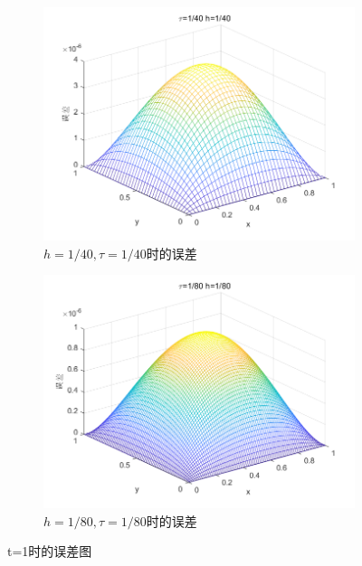 \documentclass[withoutpreface,bwprint]{cumcmthesis} %
\begin{document}
\begin{figure}
	\begin{subfigure}[b]{0.475\textwidth}   
		\centering 
		\includegraphics[width=\textwidth]{figures/f4}
		\caption[]%
		{{\small $h=1/40,\tau=1/40$时的误差}}    
		\label{fig:mean and std of net34}
	\end{subfigure}
	\quad
	\begin{subfigure}[b]{0.475\textwidth}   
		\centering 
		\includegraphics[width=\textwidth]{figures/f5}
		\caption[]%
		{{\small $h=1/80,\tau=1/80$时的误差}}    
		\label{fig:mean and std of net44}
	\end{subfigure}
	\caption[ The average and standard deviation of critical parameters ]
	{t=1时的误差图} 
	\label{fig:2}
\end{figure}
	
\end{document}
